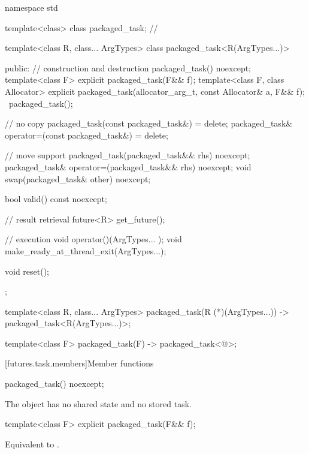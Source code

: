 %
\begin{codeblock}
namespace std {
  template<class> class packaged_task;  // \notdef

  template<class R, class... ArgTypes>
  class packaged_task<R(ArgTypes...)> {
  public:
    // construction and destruction
    packaged_task() noexcept;
    template<class F>
      explicit packaged_task(F&& f);
    template<class F, class Allocator>
      explicit packaged_task(allocator_arg_t, const Allocator& a, F&& f);
    ~packaged_task();

    // no copy
    packaged_task(const packaged_task&) = delete;
    packaged_task& operator=(const packaged_task&) = delete;

    // move support
    packaged_task(packaged_task&& rhs) noexcept;
    packaged_task& operator=(packaged_task&& rhs) noexcept;
    void swap(packaged_task& other) noexcept;

    bool valid() const noexcept;

    // result retrieval
    future<R> get_future();

    // execution
    void operator()(ArgTypes... );
    void make_ready_at_thread_exit(ArgTypes...);

    void reset();
  };

  template<class R, class... ArgTypes>
    packaged_task(R (*)(ArgTypes...)) -> packaged_task<R(ArgTypes...)>;

  template<class F> packaged_task(F) -> packaged_task<@\seebelow@>;
}
\end{codeblock}

[futures.task.members]{Member functions}

%
\begin{itemdecl}
packaged_task() noexcept;
\end{itemdecl}

\begin{itemdescr}
\pnum
\effects
The object has no shared state and no stored task.
\end{itemdescr}

%
\begin{itemdecl}
template<class F>
  explicit packaged_task(F&& f);
\end{itemdecl}

\begin{itemdescr}
\pnum
\effects
Equivalent to
.
\end{itemdescr}

